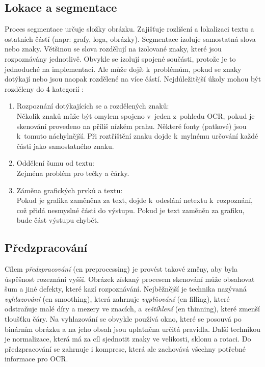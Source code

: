 \documentclass[12pt]{report}			%
\begin{document}
	\subsection{Lokace a segmentace}
	\label{sec:locate-segment}
	Proces segmentace určuje složky obrázku. Zajišťuje rozlišení a lokalizaci textu a ostatních částí (\gls{napr}: grafy, loga, obrázky). Segmentace izoluje samostatná slova nebo znaky. Většinou se slova rozdělují na izolované znaky, které jsou rozpoznávány jednotlivě. Obvykle se izolují spojené součásti, protože je to jednoduché na implementaci. Ale může dojít k~problémům, pokud se znaky dotýkají nebo jsou naopak rozdělené na více částí. \parencite[\gls{str} 17]{chaudhuri2017optical}
	Nejdůležitější úkoly mohou být rozděleny do 4 kategorií \parencite[\gls{s} 13]{eikvil-ocr}:
	\begin{enumerate}
	\item{Rozpoznání dotýkajících se a rozdělených znaků:\\ Několik znaků může být omylem spojeno v~jeden z~pohledu \gls{OCR}, pokud je skenování provedeno na příliš nízkém prahu. Některé fonty (patkové) jsou k~tomuto náchylnější. Při roztříštění znaku dojde k~mylnému určování každé části jako samostatného znaku.}
	\item{Oddělení šumu od textu:\\ Zejména problém pro tečky a čárky.}
	\item{Záměna grafických prvků a textu:\\ Pokud je grafika zaměněna za text, dojde k~odeslání netextu k~rozpoznání, což přidá nesmyslné části do výstupu. Pokud je text zaměněn za grafiku, bude část výstupu chybět.}
	\end{enumerate}
	
	\subsection{Předzpracování}
	\label{sec:Preproces}
	Cílem \emph{předzpracování} (\gls{en} preprocessing) je provést takové změny, aby byla úspěšnost rozeznání vyšší. Obrázek získaný procesem skenování může obsahovat šum a jiné defekty, které kazí rozpoznávání. Nejběžnější je technika nazývaná \emph{vyhlazování} (\gls{en} smoothing), která zahrnuje \emph{vyplňování} (\gls{en} filling), které odstraňuje malé díry a mezery ve znacích, a \emph{zeštíhlení} (\gls{en} thinning), které zmenší tloušťku čáry. Na vyhlazování se obvykle používá okno, které se posouvá po binárním obrázku a na jeho obsah jsou uplatněna určitá pravidla. Další technikou je normalizace, která má za cíl sjednotit znaky ve velikosti, sklonu a rotaci. Do předzpracování se zahrnuje i komprese, která ale zachovává všechny potřebné informace pro OCR. \parencite[\gls{s} 17-18]{chaudhuri2017optical}			
	
\end{document}
